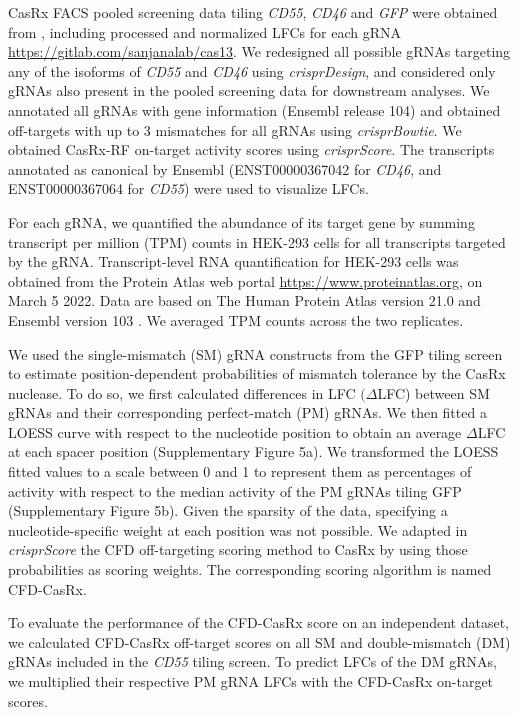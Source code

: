\documentclass[pdftex,english,10pt]{article}
\begin{document}
{CasRx FACS pooled screening data tiling \textit{CD55}, \textit{CD46} and \textit{GFP} were obtained from \citet{wessels2020massively}, including processed and normalized LFCs for each gRNA \url{https://gitlab.com/sanjanalab/cas13}. We redesigned all possible gRNAs targeting any of the isoforms of \textit{CD55} and \textit{CD46} using \textit{crisprDesign}, and considered only gRNAs also present in the pooled screening data for downstream analyses. We annotated all gRNAs with gene information (Ensembl release 104) and obtained off-targets with up to 3 mismatches for all gRNAs using \textit{crisprBowtie}. 
We obtained CasRx-RF on-target activity scores using \textit{crisprScore}. 
The transcripts annotated as canonical by Ensembl (ENST00000367042 for \textit{CD46}, and ENST00000367064 for \textit{CD55}) were used to visualize LFCs. 

For each gRNA, we quantified the abundance of its target gene by summing transcript per million (TPM) counts in HEK-293 cells for all transcripts targeted by the gRNA. Transcript-level RNA quantification for HEK-293 cells was obtained from the Protein Atlas web portal \url{https://www.proteinatlas.org},
on March 5 2022. Data are based on The Human Protein Atlas version 21.0 and Ensembl version 103 .
We averaged TPM counts across the two replicates. 

We used the single-mismatch (SM) gRNA constructs from the GFP tiling screen to estimate position-dependent probabilities of mismatch tolerance by the CasRx nuclease. To do so, we first calculated differences in LFC $(\Delta$LFC) between SM gRNAs and their corresponding perfect-match (PM) gRNAs. We then fitted a LOESS curve with respect to the nucleotide position to obtain an average $\Delta$LFC at each spacer position (Supplementary Figure 5a). We transformed the LOESS fitted values to a scale between 0 and 1 to represent them as percentages of activity with respect to the median activity of the PM gRNAs tiling GFP (Supplementary Figure 5b). Given the sparsity of the data, specifying a nucleotide-specific weight at each position was not possible. We adapted in \textit{crisprScore} the CFD off-targeting scoring method to CasRx by using those probabilities as scoring weights. The corresponding scoring algorithm is named CFD-CasRx. 

To evaluate the performance of the CFD-CasRx score on an independent dataset, we calculated CFD-CasRx off-target scores on all SM and double-mismatch (DM) gRNAs included in the \textit{CD55} tiling screen. To predict LFCs of the DM gRNAs, we multiplied their respective PM gRNA LFCs with the CFD-CasRx on-target scores. 


}
\end{document}
